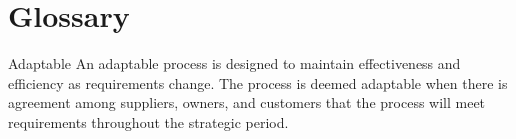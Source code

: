 
\section{Glossary}
\begin{Glossary}
\item[Adaptable] An adaptable process is designed to maintain effectiveness and
efficiency as requirements change. The process is deemed adaptable when there
is agreement among suppliers, owners, and customers that the process will meet
requirements throughout the strategic period.
\end{Glossary}

